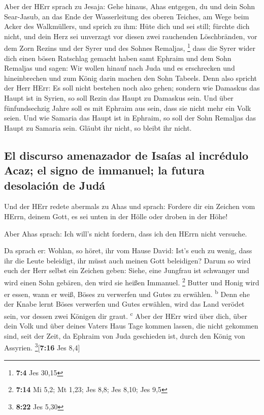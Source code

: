  Aber der HErr sprach zu Jesaja: Gehe hinaus, Ahas
entgegen, du und dein Sohn Sear-Jasub, an das Ende der Wasserleitung des
oberen Teiches, am Wege beim Acker des Walkmüllers,  und
sprich zu ihm: Hüte dich und sei still; fürchte dich nicht, und dein
Herz sei unverzagt vor diesen zwei rauchenden Löschbränden, vor dem Zorn
Rezins und der Syrer und des Sohnes Remaljas, \footnote{\textbf{7:4} Jes
  30,15}  dass die Syrer wider dich einen bösen Ratschlag
gemacht haben samt Ephraim und dem Sohn Remaljas und sagen:
 Wir wollen hinauf nach Juda und es erschrecken und
hineinbrechen und zum König darin machen den Sohn Tabeels.
 Denn also spricht der Herr HErr: Es soll nicht bestehen
noch also gehen;  sondern wie Damaskus das Haupt ist in
Syrien, so soll Rezin das Haupt zu Damaskus sein. Und über
fünfundsechzig Jahre soll es mit Ephraim aus sein, dass sie nicht mehr
ein Volk seien.  Und wie Samaria das Haupt ist in Ephraim,
so soll der Sohn Remaljas das Haupt zu Samaria sein. Gläubt ihr nicht,
so bleibt ihr nicht.

\hypertarget{el-discurso-amenazador-de-isauxedas-al-incruxe9dulo-acaz-el-signo-de-immanuel-la-futura-desolaciuxf3n-de-juduxe1}{%
\subsection{El discurso amenazador de Isaías al incrédulo Acaz; el signo
de immanuel; la futura desolación de
Judá}\label{el-discurso-amenazador-de-isauxedas-al-incruxe9dulo-acaz-el-signo-de-immanuel-la-futura-desolaciuxf3n-de-juduxe1}}

 Und der HErr redete abermals zu Ahas und sprach:
 Fordere dir ein Zeichen vom HErrn, deinem Gott, es sei
unten in der Hölle oder droben in der Höhe!

 Aber Ahas sprach: Ich will's nicht fordern, dass ich den
HErrn nicht versuche.

 Da sprach er: Wohlan, so höret, ihr vom Hause David:
Ist's euch zu wenig, dass ihr die Leute beleidigt, ihr müsst auch meinen
Gott beleidigen?  Darum so wird euch der Herr selbst ein
Zeichen geben: Siehe, eine Jungfrau ist schwanger und wird einen Sohn
gebären, den wird sie heißen Immanuel. \footnote{\textbf{7:14} Mi 5,2;
  Mt 1,23; Jes 8,8; Jes 8,10; Jes 9,5}  Butter und Honig
wird er essen, wann er weiß, Böses zu verwerfen und Gutes zu erwählen.
\textsuperscript{b}  Denn ehe der Knabe lernt Böses
verwerfen und Gutes erwählen, wird das Land verödet sein, vor dessen
zwei Königen dir graut. \textsuperscript{c}  Aber der
HErr wird über dich, über dein Volk und über deines Vaters Haus Tage
kommen lassen, die nicht gekommen sind, seit der Zeit, da Ephraim von
Juda geschieden ist, durch den König von Assyrien.
\footnote{\textbf{8:22} Jes 5,30}{[}\textbf{7:16} Jes 8,4{]}


